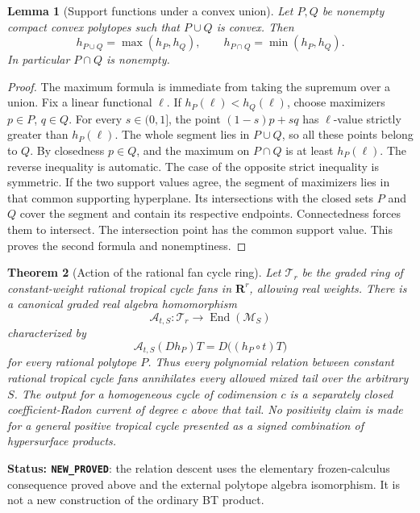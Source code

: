\documentclass[11pt,a4paper]{article}
\numberwithin{equation}{section}
\newtheorem{theorem}{Theorem}[section]
\newtheorem{lemma}[theorem]{Lemma}
\theoremstyle{definition}
\theoremstyle{remark}
\begin{document}
\begin{lemma}[Support functions under a convex union]
\label{lem:r6-support-min-convex-union}
Let $P,Q$ be nonempty compact convex polytopes such that
$P\cup Q$ is convex. Then
\[
 h_{P\cup Q}=\max(h_P,h_Q),\qquad
 h_{P\cap Q}=\min(h_P,h_Q).
\]
In particular $P\cap Q$ is nonempty.
\end{lemma}

\begin{proof}
The maximum formula is immediate from taking the supremum
over a union. Fix a linear functional $\ell$. If
$h_P(\ell)<h_Q(\ell)$, choose maximizers $p\in P$, $q\in Q$.
For every $s\in(0,1]$, the point $(1-s)p+sq$ has $\ell$-value
strictly greater than $h_P(\ell)$. The whole segment lies in
$P\cup Q$, so all these points belong to $Q$. By closedness
$p\in Q$, and the maximum on $P\cap Q$ is at least
$h_P(\ell)$. The reverse inequality is automatic. The case
of the opposite strict inequality is symmetric.
If the two support values agree, the segment of maximizers
lies in that common supporting hyperplane. Its intersections
with the closed sets $P$ and $Q$ cover the segment and contain
its respective endpoints. Connectedness forces them to
intersect. The intersection point has the common support
value. This proves the second formula and nonemptiness.
\end{proof}

\begin{theorem}[Action of the rational fan cycle ring]
\label{thm:r6-ambient-cycle-action}
Let $\mathcal T_r$ be the graded ring of constant-weight
rational tropical cycle fans in $\mathbf R^r$, allowing
real weights. There is a canonical graded real algebra
homomorphism
\[
 \mathcal A_{t,S}:\mathcal T_r
                      \longrightarrow\operatorname{End}(\mathscr M_S)
\]
characterized by
\begin{equation}
 \mathcal A_{t,S}(D h_P)T=D\bigl((h_P\circ t)T\bigr)
 \label{eq:r6-cycle-action-divisor}
\end{equation}
for every rational polytope $P$. Thus every polynomial
relation between constant rational tropical cycle fans
annihilates every allowed mixed tail over the arbitrary $S$.
The output for a homogeneous cycle of codimension $c$ is
a separately closed coefficient-Radon current of degree
$c$ above that tail. No positivity claim is made for a
general positive tropical cycle presented as a signed
combination of hypersurface products.
\end{theorem}

\noindent\textbf{Status: \texttt{NEW\_PROVED}}: the relation
descent uses the elementary frozen-calculus consequence
proved above and the external polytope algebra isomorphism.
It is not a new construction of the ordinary BT product.
\end{document}
